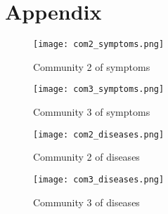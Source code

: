 \section{Appendix}


\begin{figure}[H]
	\centering
	\texttt{[image: com2\_symptoms.png]}
	\caption{Community 2 of symptoms}
	\label{fig:com2_symptoms}
 \end{figure}
 \noindent
 \begin{figure}[H]
	\centering
	\texttt{[image: com3\_symptoms.png]}
	\caption{Community 3 of symptoms}
	\label{fig:com3_symptoms}
 \end{figure}
 \noindent
 
 
 \begin{figure}[H]
	\centering
	\texttt{[image: com2\_diseases.png]}
	\caption{Community 2 of diseases}
	\label{fig:com2_diseases}
 \end{figure}
 \noindent
 \begin{figure}[H]
	\centering
	\texttt{[image: com3\_diseases.png]}
	\caption{Community 3 of diseases}
	\label{fig:com3_diseases}
 \end{figure}
 \noindent